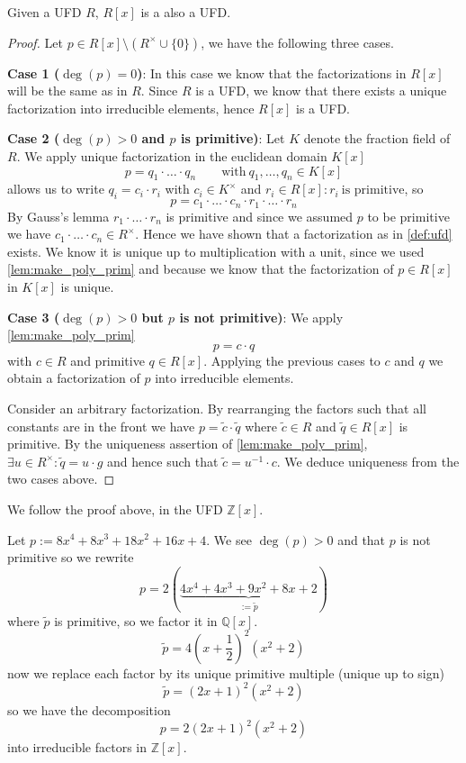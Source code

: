 \begin{theorem}
   Given a UFD \(R\), \(R[x]\) is a also a UFD.
\end{theorem}
\begin{proof}
   Let \(p \in R[x] \setminus (R^\times \cup \{0\})\), we have the following three cases.

   \textbf{Case 1 (\(\deg(p) = 0\))}: In this case we know that the factorizations in \(R[x]\) will be the same as in \(R\).
   Since \(R\) is a UFD, we know that there exists a unique factorization into irreducible elements, hence \(R[x]\) is a UFD.

   \textbf{Case 2 (\(\deg(p) > 0\) and \(p\) is primitive)}: Let \(K\) denote the fraction field of \(R\).
   We apply unique factorization in the euclidean domain \(K[x]\)
   \[p = q_1 \cdot \ldots \cdot q_n \qquad\text{with}~q_1, \ldots, q_n \in K[x]\]
    allows us to write \(q_i = c_i \cdot r_i\) with \(c_i \in K^\times\) and \(r_i \in R[x]: r_i~\text{is primitive}\), so
   \[p = c_1 \cdot \ldots \cdot c_n \cdot r_1 \cdot \ldots \cdot r_n\]
   By Gauss's lemma \(r_1 \cdot \ldots \cdot r_n\) is primitive and since we assumed \(p\) to be primitive we have \(c_1 \cdot \ldots \cdot c_n \in R^\times\).
   Hence we have shown that a factorization as in \cref{def:ufd} exists.
   We know it is unique up to multiplication with a unit, since we used \cref{lem:make_poly_prim} and because we know that the factorization of \(p \in R[x]\) in \(K[x]\) is unique.

   \textbf{Case 3 (\(\deg(p) > 0\) but \(p\) is not primitive)}: We apply \cref{lem:make_poly_prim}
   \[p = c \cdot q\]
   with \(c \in R\) and primitive \(q \in R[x]\).
   Applying the previous cases to \(c\) and \(q\) we obtain a factorization of \(p\) into irreducible elements.

   Consider an arbitrary factorization.
   By rearranging the factors such that all constants are in the front we have \(p = \tilde{c} \cdot \tilde{q}\) where \(\tilde{c} \in R\) and \(\tilde{q} \in R[x]\) is primitive.
   By the uniqueness assertion of \cref{lem:make_poly_prim}, \(\exists u \in R^\times: \tilde{q} = u\cdot g\) and hence such that \(\tilde{c} = u^{-1} \cdot c\).
   We deduce uniqueness from the two cases above.
\end{proof}
\begin{example}
   We follow the proof above, in the UFD \(\mathbb{Z}[x]\).

   Let \(p := 8x^4 + 8x^3 + 18x^2 + 16x + 4\).
   We see \(\deg(p) > 0\) and that \(p\) is not primitive so we rewrite
   \[p = 2(\underbrace{4x^4 + 4x^3 + 9x^2 + 8x + 2}_{:= \tilde{p}})\]
   where \(\tilde{p}\) is primitive, so we factor it in \(\mathbb{Q}[x]\).
   \[\tilde{p} = 4(x + \frac{1}{2})^2 (x^2 + 2)\]
   now we replace each factor by its unique primitive multiple (unique up to sign)
   \[\tilde{p} = (2x + 1)^2 (x^2 + 2)\]
   so we have the decomposition
   \[p = 2(2x + 1)^2(x^2 + 2)\]
   into irreducible factors in \(\mathbb{Z}[x]\).
\end{example}
